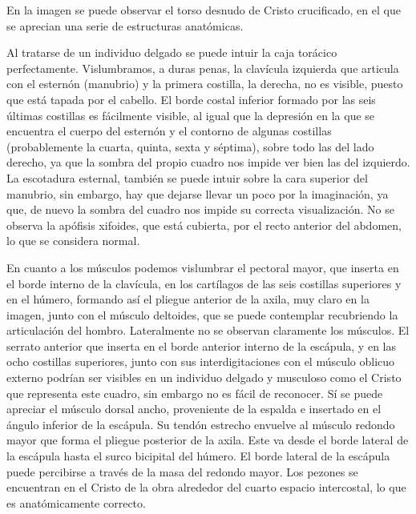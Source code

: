 En la imagen se puede observar el torso desnudo de Cristo crucificado, en el que se aprecian una serie de estructuras anatómicas. 

Al tratarse de un individuo delgado se puede intuir la caja torácico perfectamente. Vislumbramos, a duras penas, la clavícula izquierda que articula con el esternón (manubrio) y la primera costilla, la derecha, no es visible, puesto que está tapada por el cabello. El borde costal inferior formado por las seis últimas costillas es fácilmente visible, al igual que la depresión en la que se encuentra el cuerpo del esternón y el contorno de algunas costillas (probablemente la cuarta, quinta, sexta y séptima), sobre todo las del lado derecho, ya que la sombra del propio cuadro nos  impide ver bien las del izquierdo. La escotadura esternal, también se puede intuir sobre la cara superior del manubrio, sin embargo, hay que dejarse llevar un poco por la imaginación, ya que, de nuevo la sombra del cuadro nos impide su correcta visualización. No se observa la apófisis xifoides, que está cubierta, por el recto anterior del abdomen, lo que se considera normal.

En cuanto a los músculos podemos vislumbrar el pectoral mayor, que inserta en el borde interno de la clavícula, en los cartílagos de las seis costillas superiores y en el húmero, formando así el pliegue anterior de la axila, muy claro en la imagen, junto con el músculo deltoides, que se puede contemplar recubriendo la articulación del hombro. Lateralmente no se observan claramente los músculos. El serrato anterior que inserta en el borde anterior interno de la escápula, y en las ocho costillas superiores, junto con sus interdigitaciones con el músculo oblicuo externo podrían ser visibles en un individuo delgado y musculoso como el Cristo que representa este cuadro, sin embargo no es fácil de reconocer. Sí se puede apreciar el músculo dorsal ancho, proveniente de la espalda e insertado en el ángulo inferior de la escápula. Su tendón estrecho envuelve al músculo redondo mayor que forma el pliegue posterior de la axila. Este va desde el borde lateral de la escápula hasta el surco bicipital del húmero. El borde lateral de la escápula puede percibirse a través de la masa del redondo mayor.
Los pezones se encuentran en el Cristo de la obra alrededor del cuarto espacio intercostal, lo que es anatómicamente correcto.


